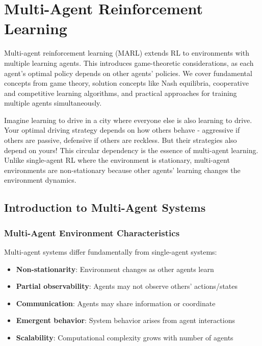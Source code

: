 \chapter{Multi-Agent Reinforcement Learning}
\label{ch:multi-agent-rl}

\begin{keyideabox}
Multi-agent reinforcement learning (MARL) extends RL to environments with multiple learning agents. This introduces game-theoretic considerations, as each agent's optimal policy depends on other agents' policies. We cover fundamental concepts from game theory, solution concepts like Nash equilibria, cooperative and competitive learning algorithms, and practical approaches for training multiple agents simultaneously.
\end{keyideabox}

\begin{intuitionbox}
Imagine learning to drive in a city where everyone else is also learning to drive. Your optimal driving strategy depends on how others behave - aggressive if others are passive, defensive if others are reckless. But their strategies also depend on yours! This circular dependency is the essence of multi-agent learning. Unlike single-agent RL where the environment is stationary, multi-agent environments are non-stationary because other agents' learning changes the environment dynamics.
\end{intuitionbox}

\section{Introduction to Multi-Agent Systems}

\subsection{Multi-Agent Environment Characteristics}

Multi-agent systems differ fundamentally from single-agent systems:

\begin{itemize}
    \item \textbf{Non-stationarity}: Environment changes as other agents learn
    \item \textbf{Partial observability}: Agents may not observe others' actions/states
    \item \textbf{Communication}: Agents may share information or coordinate
    \item \textbf{Emergent behavior}: System behavior arises from agent interactions
    \item \textbf{Scalability}: Computational complexity grows with number of agents
\end{itemize}

